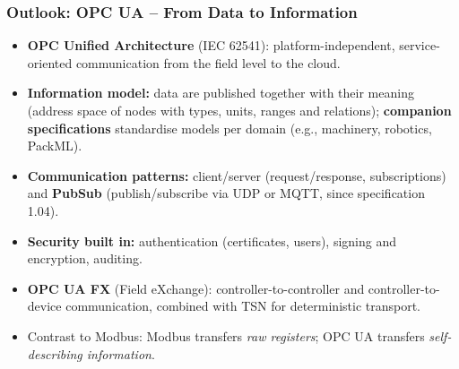 \begin{frame}
	\frametitle{Outlook: OPC UA -- From Data to Information}
	\begin{itemize}
		\item \textbf{OPC Unified Architecture} (IEC 62541): platform-independent, service-oriented communication from the field level to the cloud.
		\item \textbf{Information model:} data are published together with their meaning (address space of nodes with types, units, ranges and relations); \textbf{companion specifications} standardise models per domain (e.g., machinery, robotics, PackML).
		\item \textbf{Communication patterns:} client/server (request/response, subscriptions) and \textbf{PubSub} (publish/subscribe via UDP or MQTT, since specification 1.04).
		\item \textbf{Security built in:} authentication (certificates, users), signing and encryption, auditing.
		\item \textbf{OPC UA FX} (Field eXchange): controller-to-controller and controller-to-device communication, combined with TSN for deterministic transport.
		\item Contrast to Modbus: Modbus transfers \emph{raw registers}; OPC UA transfers \emph{self-describing information}.
	\end{itemize}
\end{frame}

